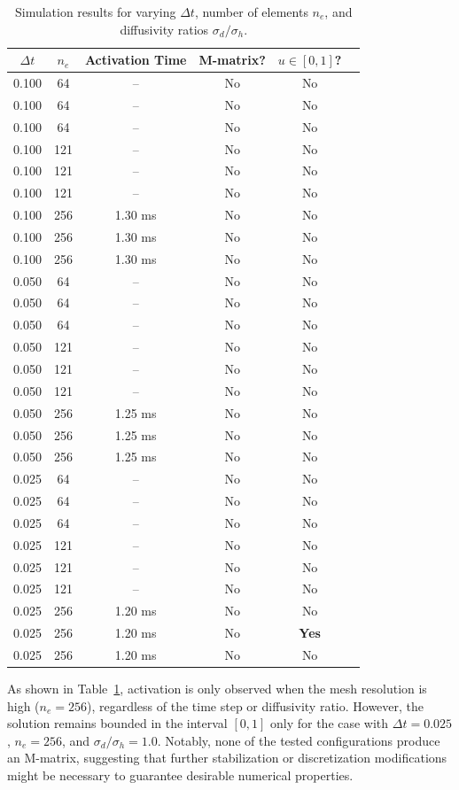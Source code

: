 \documentclass[12pt,a4paper]{article}
\begin{document}
\begin{table}[H]
\centering
\begin{tabular}{cccccc}
    \toprule
    $\Delta t$ & $n_e$ & Activation Time & M-matrix? & $u \in [0,1]$? \\
    \midrule
    0.100 & 64  & --     & No  & No \\
    0.100 & 64   & --     & No  & No \\
    0.100 & 64   & --     & No  & No \\
    0.100 & 121 & --     & No  & No \\
    0.100 & 121  & --     & No  & No \\
    0.100 & 121  & --     & No  & No \\
    0.100 & 256 & 1.30 ms & No & No \\
    0.100 & 256  & 1.30 ms & No & No \\
    0.100 & 256  & 1.30 ms & No & No \\
    0.050 & 64  & --     & No  & No \\
    0.050 & 64   & --     & No  & No \\
    0.050 & 64   & --     & No  & No \\
    0.050 & 121 & --     & No  & No \\
    0.050 & 121  & --     & No  & No \\
    0.050 & 121  & --     & No  & No \\
    0.050 & 256 & 1.25 ms & No & No \\
    0.050 & 256  & 1.25 ms & No & No \\
    0.050 & 256  & 1.25 ms & No & No \\
    0.025 & 64  & --     & No  & No \\
    0.025 & 64   & --     & No  & No \\
    0.025 & 64   & --     & No  & No \\
    0.025 & 121 & --     & No  & No \\
    0.025 & 121  & --     & No  & No \\
    0.025 & 121  & --     & No  & No \\
    0.025 & 256 & 1.20 ms & No & No \\
    0.025 & 256  & 1.20 ms & No & \textbf{Yes} \\
    0.025 & 256  & 1.20 ms & No & No \\
    \bottomrule
\end{tabular}
\caption{Simulation results for varying $\Delta t$, number of elements $n_e$, and diffusivity ratios $\sigma_d / \sigma_h$.}
\label{tab:simulation_results}
\end{table}
As shown in Table~\ref{tab:simulation_results}, activation is only observed when the mesh resolution is high ($n_e = 256$), regardless of the time step or diffusivity ratio. However, the solution remains bounded in the interval $[0,1]$ only for the case with $\Delta t = 0.025$, $n_e = 256$, and $\sigma_d/\sigma_h = 1.0$. Notably, none of the tested configurations produce an M-matrix, suggesting that further stabilization or discretization modifications might be necessary to guarantee desirable numerical properties.
\end{document}
